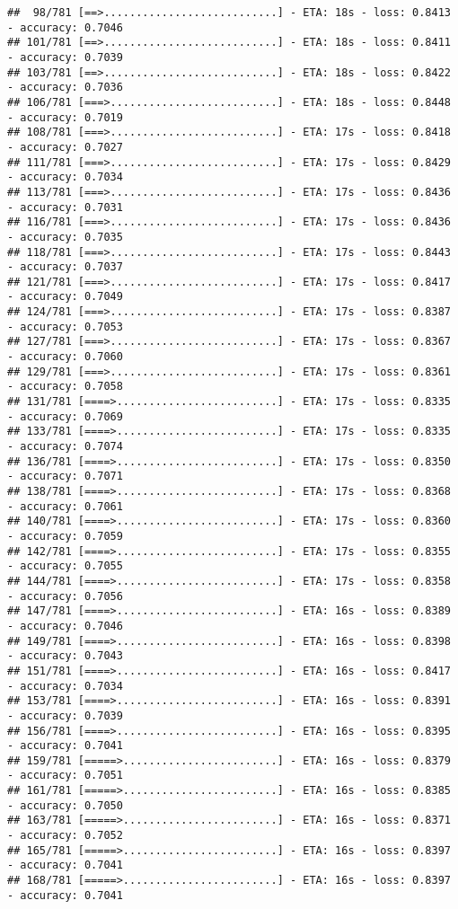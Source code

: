 \documentclass[
]{article}
\begin{document}
\begin{verbatim}
##  98/781 [==>...........................] - ETA: 18s - loss: 0.8413 - accuracy: 0.7046
## 101/781 [==>...........................] - ETA: 18s - loss: 0.8411 - accuracy: 0.7039
## 103/781 [==>...........................] - ETA: 18s - loss: 0.8422 - accuracy: 0.7036
## 106/781 [===>..........................] - ETA: 18s - loss: 0.8448 - accuracy: 0.7019
## 108/781 [===>..........................] - ETA: 17s - loss: 0.8418 - accuracy: 0.7027
## 111/781 [===>..........................] - ETA: 17s - loss: 0.8429 - accuracy: 0.7034
## 113/781 [===>..........................] - ETA: 17s - loss: 0.8436 - accuracy: 0.7031
## 116/781 [===>..........................] - ETA: 17s - loss: 0.8436 - accuracy: 0.7035
## 118/781 [===>..........................] - ETA: 17s - loss: 0.8443 - accuracy: 0.7037
## 121/781 [===>..........................] - ETA: 17s - loss: 0.8417 - accuracy: 0.7049
## 124/781 [===>..........................] - ETA: 17s - loss: 0.8387 - accuracy: 0.7053
## 127/781 [===>..........................] - ETA: 17s - loss: 0.8367 - accuracy: 0.7060
## 129/781 [===>..........................] - ETA: 17s - loss: 0.8361 - accuracy: 0.7058
## 131/781 [====>.........................] - ETA: 17s - loss: 0.8335 - accuracy: 0.7069
## 133/781 [====>.........................] - ETA: 17s - loss: 0.8335 - accuracy: 0.7074
## 136/781 [====>.........................] - ETA: 17s - loss: 0.8350 - accuracy: 0.7071
## 138/781 [====>.........................] - ETA: 17s - loss: 0.8368 - accuracy: 0.7061
## 140/781 [====>.........................] - ETA: 17s - loss: 0.8360 - accuracy: 0.7059
## 142/781 [====>.........................] - ETA: 17s - loss: 0.8355 - accuracy: 0.7055
## 144/781 [====>.........................] - ETA: 17s - loss: 0.8358 - accuracy: 0.7056
## 147/781 [====>.........................] - ETA: 16s - loss: 0.8389 - accuracy: 0.7046
## 149/781 [====>.........................] - ETA: 16s - loss: 0.8398 - accuracy: 0.7043
## 151/781 [====>.........................] - ETA: 16s - loss: 0.8417 - accuracy: 0.7034
## 153/781 [====>.........................] - ETA: 16s - loss: 0.8391 - accuracy: 0.7039
## 156/781 [====>.........................] - ETA: 16s - loss: 0.8395 - accuracy: 0.7041
## 159/781 [=====>........................] - ETA: 16s - loss: 0.8379 - accuracy: 0.7051
## 161/781 [=====>........................] - ETA: 16s - loss: 0.8385 - accuracy: 0.7050
## 163/781 [=====>........................] - ETA: 16s - loss: 0.8371 - accuracy: 0.7052
## 165/781 [=====>........................] - ETA: 16s - loss: 0.8397 - accuracy: 0.7041
## 168/781 [=====>........................] - ETA: 16s - loss: 0.8397 - accuracy: 0.7041

\end{verbatim}
\end{document}
